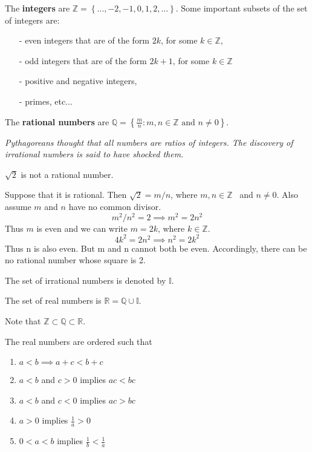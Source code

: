 \documentclass[../main.tex]{subfiles}
\begin{document}
The \textbf{integers} are $\mathbb{Z}= \left\{ \dots, -2, -1, 0,1, 2, \dots \right\}$. Some important subsets of the set of integers are:
\begin{itemize}
  \item[-] even integers that are of the form $2k$, for some $k\in \mathbb{Z}$,
  \item[-] odd integers that are of the form $2k+1$, for some $k\in \mathbb{Z}$
  \item[-] positive and negative integers,
  \item[-] primes, etc...
\end{itemize}

The \textbf{rational numbers} are $\mathbb{Q=}\left\{ \frac{m}{n}:m,n\in \mathbb{Z}\text{ and }n\neq 0\right\}$.

\textit{Pythagoreans thought that all numbers are ratios of integers. The discovery of irrational numbers is said to have shocked them.}

\begin{example}
$\sqrt{2}$ is not a rational number.

Suppose that it is rational. Then $\sqrt{2}=m/n$, where $m,n\in \mathbb{Z}$ \ and $n\neq 0$. Also assume $m$ and $n$ have no common divisor.
\[
  m^{2}/n^{2}=2  \implies m^{2}=2n^{2}
\]
Thus $m$ is even and we can write $m=2k$, where $k\in \mathbb{Z}$.
\[
  4k^{2}=2n^{2} \implies n^{2}=2k^{2}
\]
Thus n is also even. But m and n cannot both be even. Accordingly, there can be no rational number whose square is 2.
\end{example}

The set of irrational numbers is denoted by $\mathbb{I}$.

The set of real numbers is $\mathbb{R} = \mathbb{Q} \cup \mathbb{I}$.

Note that $\mathbb{Z} \subset \mathbb{Q} \subset \mathbb{R}$.

The real numbers are ordered such that
\begin{enumerate}
\item $a<b \implies a+c<b+c$

\item $a<b$ and $c>0$ implies $ac<bc$

\item $a<b$ and $c<0$ implies $ac>bc$

\item $a>0$ implies $\frac{1}{a}>0$

\item $0<a<b$ implies $\frac{1}{b}<\frac{1}{a}$
\end{enumerate}
\end{document}
